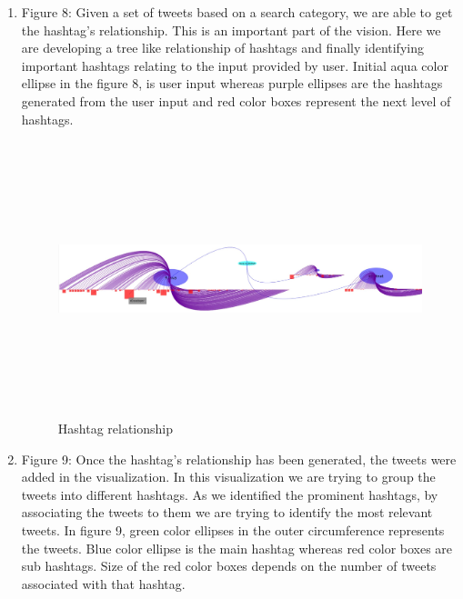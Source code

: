 \documentclass[11pt]{article}
\begin{document}
\begin{enumerate}
\item Figure 8: Given a set of tweets based on a search category, we are able to get the hashtag's relationship. This is an important part of the vision. Here we are developing a tree like relationship of hashtags and finally identifying important hashtags relating to the input provided by user. Initial aqua color ellipse in the figure 8, is user input whereas purple ellipses are the hashtags generated from the user input and red color boxes represent the next level of hashtags.
\begin{figure}[h]
\centering
\includegraphics[width=\textwidth, height=8cm]{JustHashTags.jpg}
\caption{Hashtag relationship}
\end{figure}
\item Figure 9: Once the hashtag's relationship has been generated, the tweets were added in the visualization. In this visualization we are trying to group the tweets into different hashtags. As we identified the prominent hashtags, by associating the tweets to them we are trying to identify the most relevant tweets. In figure 9, green color ellipses in the outer circumference represents the tweets. Blue color ellipse is the main hashtag whereas red color boxes are sub hashtags. Size of the red color boxes depends on the number of tweets associated with that hashtag.


\end{enumerate}
\end{document}
